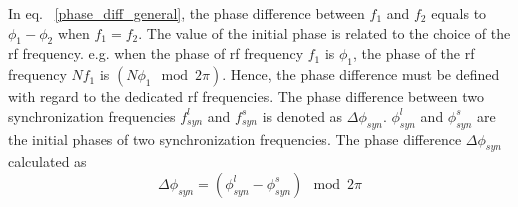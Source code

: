 In eq. ~\ref{phase_diff_general}, the phase difference between $f_1$ and $f_2$ equals to $\phi_1-\phi_2$ when $f_1=f_2$. The value of the initial phase is related to the choice of the rf frequency. e.g. when the phase of rf frequency $f_1$ is $\phi_1$, the phase of the rf frequency $Nf_1$ is $(N\phi_1 \mod 2\pi)$. Hence, the phase difference must be defined with regard to the dedicated rf frequencies. The phase difference between two synchronization frequencies $f_{\mathit{syn}}^{l}$ and $f_{\mathit{syn}}^{s}$ is denoted as $\Delta \phi_\mathit{syn}$. $\phi^l_\mathit{syn}$ and $\phi^s_\mathit{syn}$ are the initial phases of two synchronization frequencies. The phase difference $\Delta \phi_\mathit{syn}$ calculated as
\begin{equation}
\label{phase_diff_cir_int1}
	\Delta \phi_\mathit{syn}=(\phi^l_\mathit{syn}-\phi^s_\mathit{syn}) \mod 2\pi
\end{equation}

